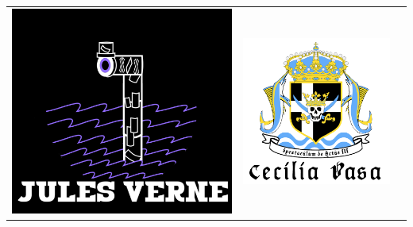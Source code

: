 \begin{tabular}{ccc}
    \includegraphics[width=\gamlaAffischerLength]{Bilder/TidigareSpexloggor/jules_verne.png}&
    \includegraphics[width=\gamlaAffischerLength]{Bilder/TidigareSpexloggor/CeciliaVasa.png}&

\end{tabular}
